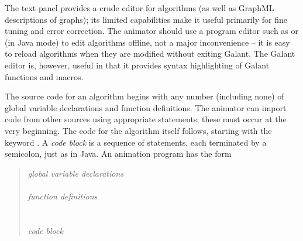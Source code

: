 The text panel provides a crude editor for algorithms (as well as GraphML
descriptions of graphs);
its limited capabilities make it useful primarily for fine tuning and error correction.
The animator should use a program editor such as  or
 (in Java mode) to edit algorithms offline,
not a major inconvenience -- it is easy to reload algorithms when they are modified
without exiting Galant.
The Galant editor is, however, useful in that it provides syntax highlighting of Galant
functions and macros.

The source code for an algorithm begins with any number (including none)
of global variable declarations and function definitions.
The animator can import code from other sources using appropriate
 statements; these must occur at the very beginning.
The code for the algorithm itself follows, starting with the keyword
.
A \emph{code block}
is a sequence of statements, each terminated by a semicolon, just as in
Java.
An animation program has the form
\begin{quote}
  \emph{global variable declarations}\\
  \\
  \emph{function definitions}\\
  \\
  \\
  \hspace*{2em}\emph{code block}\\
  \Code{\}}
\end{quote}

